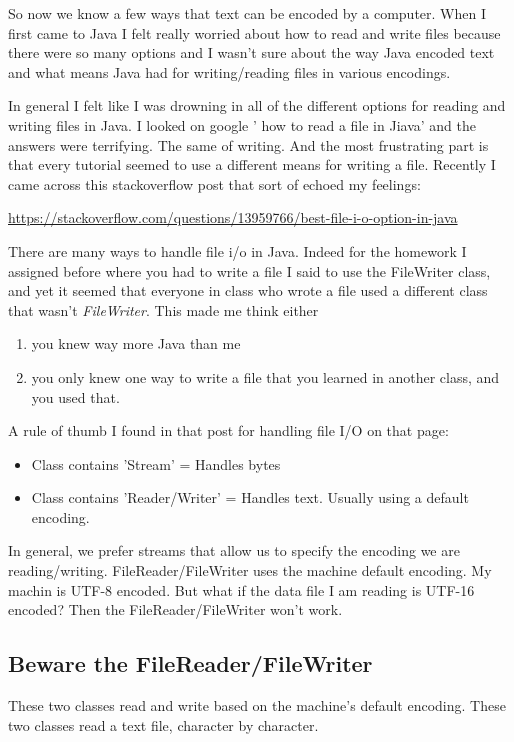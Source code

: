 \documentclass[12pt]{article}
\begin{document}
So now we know a few ways that text can be encoded by a computer. When I first came to Java I felt really worried about how to read and write files because there were so many options and I wasn't sure about the way Java encoded text and what means Java had for writing/reading files in various encodings. 

In general I felt like I was drowning in all of the different options for reading and writing files in Java. I looked on google ' how to read a file in Jiava' and the answers were terrifying. The same of writing. And the most frustrating part is that every tutorial seemed to use a different means for writing a file. Recently I came across this stackoverflow post that sort of echoed my feelings:

\url{https://stackoverflow.com/questions/13959766/best-file-i-o-option-in-java}

There are many ways to handle file i/o in Java. Indeed for the homework I assigned before where you had to write a file I said to use the FileWriter class, and yet it seemed that everyone in class who wrote a file used a different class that wasn't \textit{FileWriter}. This made me think either 

\begin{enumerate}
\item you knew way more Java than me
\item you only knew one way to write a file that you learned in another class, and you used that.
\end{enumerate}

 A rule of thumb I found in that post for handling file I/O on that page:
\begin{itemize}
\item Class contains 'Stream' = Handles bytes
\item Class contains 'Reader/Writer' = Handles text. Usually using a default encoding.
\end{itemize}

In general, we prefer streams that allow us to specify the encoding we are reading/writing. FileReader/FileWriter uses the machine default encoding. My machin is UTF-8 encoded. But what if the data file I am reading is UTF-16 encoded? Then the FileReader/FileWriter won't work.

\subsection{Beware the FileReader/FileWriter}
These two classes read and write based on the machine's default encoding. These two classes read a text file, character by character.
\end{document}
